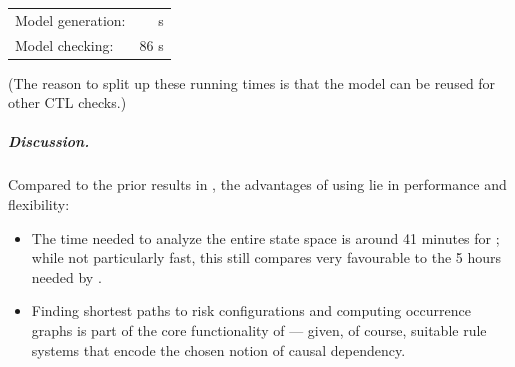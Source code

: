 \begin{center}
\begin{tabular}{lr}
Model generation: &  s \\
Model checking: & 86 s 
\end{tabular}
\end{center}
%
(The reason to split up these running times is that the model can be reused for other CTL checks.)

\subparagraph*{Discussion.}

Compared to the prior results in \cite{DBLP:conf/cmsb/BowlesBBFGM24}, the advantages of using \GROOVE lie in performance and flexibility:
\begin{itemize}
\item The time needed to analyze the entire state space is around 41 minutes for \GROOVE; while not particularly fast, this still compares very favourable to the 5 hours needed by \BioResolve.

\item Finding shortest paths to risk configurations and computing occurrence graphs is part of the core functionality of \GROOVE --- given, of course, suitable rule systems that encode the chosen notion of causal dependency.
\end{itemize}
